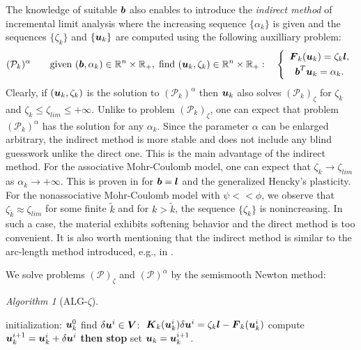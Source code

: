 \documentclass[a4paper,12pt]{article}
\theoremstyle{remark}
\newtheorem{algorithm}{Algorithm}
\newcommand{\mbf}[1]{\mbox{\boldmath$#1$}}
\numberwithin{equation}{section}
\begin{document}
The knowledge of suitable $\mbf b$ also enables to introduce the {\it indirect method} of incremental limit analysis where the increasing sequence $\{\alpha_k\}$ is given and the sequences $\{\zeta_k\}$ and $\{\mbf u_k\}$ are computed using the following auxilliary problem:
$$(\mathcal P_k)^\alpha \qquad \mbox{given }(\mbf b,\alpha_{k})\in\mathbb R^n\times\mathbb R_+,\;\mbox{find } (\mbf u_{k}, \zeta_{k})\in\mathbb R^n\times\mathbb R_+:\quad \left\{
\begin{array}{c}
\mbf{F}_{k}(\mbf{u}_{k})=\zeta_{k}\mbf{l},\\[1mm]
\mbf b^T\mbf u_{k}=\alpha_{k}.
\end{array}\right.$$ 
Clearly, if $(\mbf u_{k}, \zeta_{k})$ is the solution to $(\mathcal P_k)^\alpha$ then $\mbf u_{k}$ also solves $(\mathcal P_k)_\zeta$ for $\zeta_k$ and $\zeta_k\leq\zeta_{lim}\leq+\infty$.
Unlike to problem $(\mathcal P_k)_\zeta$, one can expect that problem $(\mathcal P_k)^\alpha$ has the solution for any $\alpha_k$. Since the parameter $\alpha$ can be enlarged arbitrary, the indirect method is more stable and does not include any blind guesswork unlike the direct one.
This is the main advantage of the indirect method. For the associative Mohr-Coulomb model, one can expect that $\zeta_k\rightarrow\zeta_{lim}$ as $\alpha_k\rightarrow+\infty$. This is proven in \cite{CHKS15, HRS16} for $\mbf b=\mbf l$ and the generalized Hencky's plasticity. For the nonassociative Mohr-Coulomb model with $\psi<<\phi$, we observe that $\zeta_{\tilde k}\approx\zeta_{lim}$ for some finite $\tilde k$ and for $k>\tilde k$, the sequence $\{\zeta_k\}$ is nonincreasing. In such a case, the material exhibits softening behavior and the direct method is too convenient. It is also worth mentioning that the indirect method is similar to the arc-length method introduced, e.g., in \cite{C97, NPO08}.

We solve problems $(\mathcal P)_\zeta$ and $(\mathcal P)^\alpha$ by the semismooth Newton method:

\begin{algorithm}[ALG-$\zeta$]
\hspace{0.2cm}
\begin{spacing}{1.2}
\begin{algorithmic}[1]
  \STATE initialization: $\mbf{u}_{k}^0$
    \STATE find $\delta \mbf{u}^{i}\in\mbf{V}$: $\;\mbf {K}_k(\mbf{u}_{k}^i)\delta  \mbf{u}^{i}=\zeta_k\mbf{l}-\mbf{F}_{k}(\mbf{u}_{k}^i)$
    \STATE compute $\mbf{u}_{k}^{i+1}=\mbf{u}_{k}^i+\delta \mbf{u}^{i}$
    \STATE {\bf if
    }{$\|\delta
    \mbf{u}^{i}\|/(\|\mbf{u}_{k}^{i+1}\|+\|\mbf{u}_{k}^i\|)\leq\epsilon_{Newton}$} {\bf then stop}
  \ENDFOR
  \STATE set $\mbf{u}_{k}=\mbf{u}_{k}^{i+1}$.
\end{algorithmic}
\end{spacing}
\end{algorithm}
\end{document}
